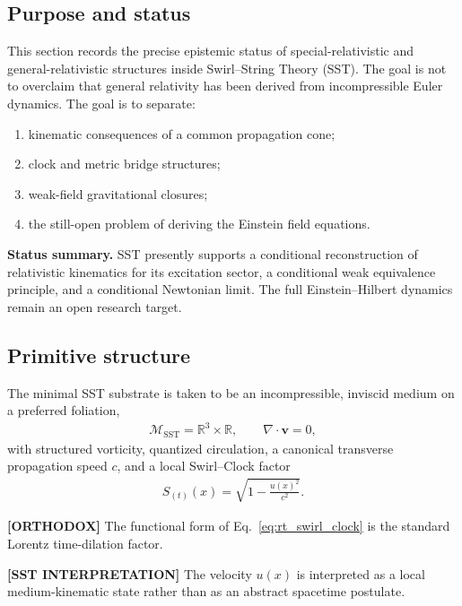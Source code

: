 \subsection{Purpose and status}

This section records the precise epistemic status of special-relativistic and
general-relativistic structures inside Swirl--String Theory (SST). The goal is
not to overclaim that general relativity has been derived from incompressible
Euler dynamics. The goal is to separate:
\begin{enumerate}
    \item kinematic consequences of a common propagation cone;
    \item clock and metric bridge structures;
    \item weak-field gravitational closures;
    \item the still-open problem of deriving the Einstein field equations.
\end{enumerate}

\textbf{Status summary.} SST presently supports a conditional reconstruction of
relativistic kinematics for its excitation sector, a conditional weak
equivalence principle, and a conditional Newtonian limit. The full
Einstein--Hilbert dynamics remain an open research target.

\subsection{Primitive structure}

The minimal SST substrate is taken to be an incompressible, inviscid medium on a
preferred foliation,
\begin{align}
    \mathcal{M}_{\mathrm{SST}}
    =
    \mathbb{R}^3 \times \mathbb{R},
    \qquad
    \nabla\cdot \mathbf{v}=0 ,
\end{align}
with structured vorticity, quantized circulation, a canonical transverse
propagation speed \(c\), and a local Swirl--Clock factor
\begin{align}
    S_{(t)}(x)
    =
    \sqrt{1-\frac{u(x)^2}{c^2}} .
    \label{eq:rt_swirl_clock}
\end{align}

\textbf{[ORTHODOX]} The functional form of
Eq.~\eqref{eq:rt_swirl_clock} is the standard Lorentz time-dilation factor.

\textbf{[SST INTERPRETATION]} The velocity \(u(x)\) is interpreted as a local
medium-kinematic state rather than as an abstract spacetime postulate.

